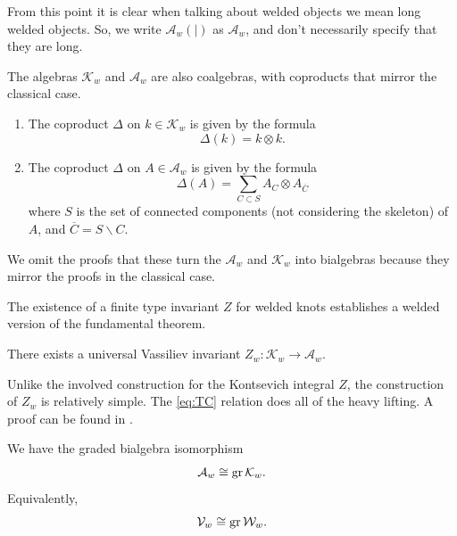 
\begin{warning}
	From this point it is clear when talking about welded objects we mean long welded objects. So, we write \(\mathcal{A}_{w}(|)\) as \(\mathcal{A}_{w}\), and don't necessarily specify that they are long.
\end{warning}

The algebras \(\mathcal{K}_{w}\) and \(\mathcal{A}_{w}\) are also coalgebras, with coproducts that mirror the classical case.

\begin{definitions}
	\begin{enumerate}
		\item The coproduct \(\Delta\) on \(k \in \mathcal{K}_{w}\) is given by the formula
		\[\Delta(k) = k \otimes k.\]
		\item The coproduct \(\Delta\) on \(A \in \mathcal{A}_{w}\) is given by the formula
		\[\Delta(A) = \sum_{C \subset S} A_{C} \otimes A_{\overline{C}}\]
		where \(S\) is the set of connected components (not considering the skeleton) of \(A\), and \(\overline{C} = S \smallsetminus C\).
	\end{enumerate}
\end{definitions}

We omit the proofs that these turn the \(\mathcal{A}_{w}\) and \(\mathcal{K}_{w}\) into bialgebras because they mirror the proofs in the classical case.

The existence of a finite type invariant \(Z\) for welded knots establishes a welded version of the fundamental theorem.

\begin{theorem}
	There exists a universal Vassiliev invariant \(Z_{w} : \mathcal{K}_{w} \to \mathcal{A}_{w}\).
\end{theorem}

Unlike the involved construction for the Kontsevich integral \(Z\), the construction of \(Z_{w}\) is relatively simple. The \ref{eq:TC} relation does all of the heavy lifting. A proof can be found in \cite{finite-type-invariants-of-w-knotted-objects-I-w-knots-and-the-alexander-polynomial}.

\begin{corollary}
	We have the graded bialgebra isomorphism
	\[\mathcal{A}_{w} \cong \operatorname{gr} \mathcal{K}_{w}.\]
	Equivalently,
	\[\mathcal{V}_{w} \cong \operatorname{gr} \mathcal{W}_{w}.\]
\end{corollary}

